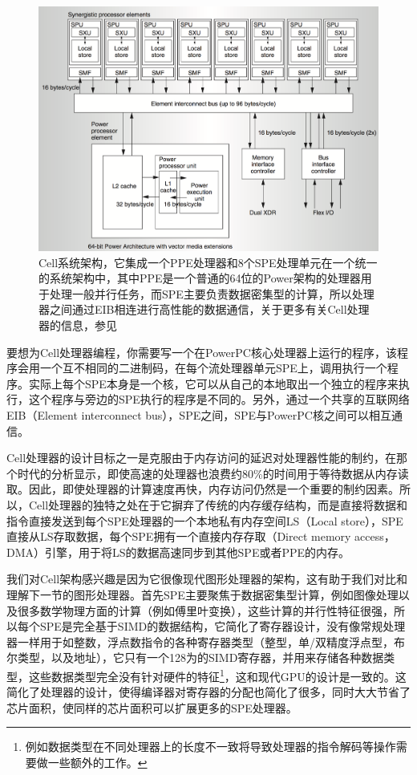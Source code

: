 \begin{figure}
	\includegraphics[width=1.\textwidth]{figures/rp/cell-architecture}
	\caption{Cell系统架构，它集成一个PPE处理器和8个SPE处理单元在一个统一的系统架构中，其中PPE是一个普通的64位的Power架构的处理器用于处理一般并行任务，而SPE主要负责数据密集型的计算，所以处理器之间通过EIB相连进行高性能的数据通信，关于更多有关Cell处理器的信息，参见\cite{a:SynergisticProcessinginCellsMulticoreArchitecture}}
	\label{f:rp-cell}
\end{figure}


要想为Cell处理器编程，你需要写一个在PowerPC核心处理器上运行的程序，该程序会用一个互不相同的二进制码，在每个流处理器单元SPE上，调用执行一个程序。实际上每个SPE本身是一个核，它可以从自己的本地取出一个独立的程序来执行，这个程序与旁边的SPE执行的程序是不同的。另外，通过一个共享的互联网络EIB（Element interconnect bus），SPE之间，SPE与PowerPC核之间可以相互通信。

Cell处理器的设计目标之一是克服由于内存访问的延迟对处理器性能的制约，在那个时代的分析显示，即使高速的处理器也浪费约80\%的时间用于等待数据从内存读取。因此，即使处理器的计算速度再快，内存访问仍然是一个重要的制约因素。所以，Cell处理器的独特之处在于它摒弃了传统的内存缓存结构，而是直接将数据和指令直接发送到每个SPE处理器的一个本地私有内存空间LS（Local store），SPE直接从LS存取数据，每个SPE拥有一个直接内存存取（Direct memory access，DMA）引擎，用于将LS的数据高速同步到其他SPE或者PPE的内存。

我们对Cell架构感兴趣是因为它很像现代图形处理器的架构，这有助于我们对比和理解下一节的图形处理器。首先SPE主要聚焦于数据密集型计算，例如图像处理以及很多数学物理方面的计算（例如傅里叶变换），这些计算的并行性特征很强，所以每个SPE是完全基于SIMD的数据结构，它简化了寄存器设计，没有像常规处理器一样用于如整数，浮点数指令的各种寄存器类型（整型，单/双精度浮点型，布尔类型，以及地址），它只有一个128为的SIMD寄存器，并用来存储各种数据类型，这些数据类型完全没有针对硬件的特征\footnote{例如数据类型在不同处理器上的长度不一致将导致处理器的指令解码等操作需要做一些额外的工作。}，这和现代GPU的设计是一致的。这简化了处理器的设计，使得编译器对寄存器的分配也简化了很多，同时大大节省了芯片面积，使同样的芯片面积可以扩展更多的SPE处理器。

